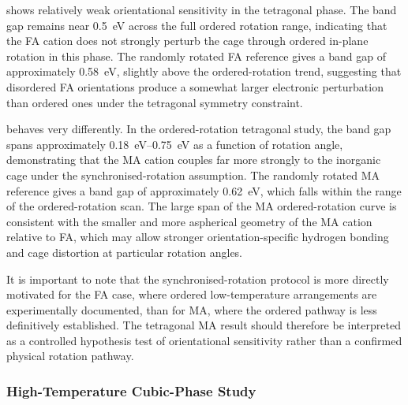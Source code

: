 \FASnI{} shows relatively weak orientational sensitivity in the
tetragonal phase.
The band gap remains near \SI{0.5}{eV} across the full ordered
rotation range, indicating that the FA cation does not strongly
perturb the  cage through ordered in-plane rotation in
this phase.
The randomly rotated FA reference gives a band gap of approximately
\SI{0.58}{eV}, slightly above the ordered-rotation trend, suggesting
that disordered FA orientations produce a somewhat larger electronic
perturbation than ordered ones under the tetragonal symmetry
constraint.

\MASnI{} behaves very differently.
In the ordered-rotation tetragonal study, the band gap spans
approximately \SIrange{0.18}{0.75}{eV} as a function of rotation
angle, demonstrating that the MA cation couples far more strongly
to the inorganic cage under the synchronised-rotation assumption.
The randomly rotated MA reference gives a band gap of approximately
\SI{0.62}{eV}, which falls within the range of the ordered-rotation
scan.
The large span of the MA ordered-rotation curve is consistent with
the smaller and more aspherical geometry of the MA cation relative
to FA, which may allow stronger orientation-specific hydrogen
bonding and cage distortion at particular rotation angles.
\cite{maheshwari2019relation}

It is important to note that the synchronised-rotation protocol
is more directly motivated for the FA case, where ordered
low-temperature arrangements are experimentally documented, than for
MA, where the ordered pathway is less definitively established.
\cite{schueller2018crystal}
The tetragonal MA result should therefore be interpreted as a
controlled hypothesis test of orientational sensitivity rather than
a confirmed physical rotation pathway.


\subsubsection{High-Temperature Cubic-Phase Study}

